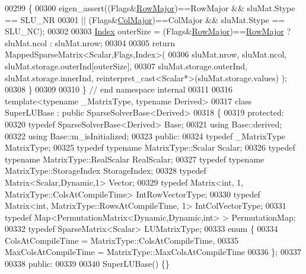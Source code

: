 \begin{DoxyCode}
00299 \{
00300   eigen\_assert((Flags&\hyperlink{group__enums_ggaacded1a18ae58b0f554751f6cdf9eb13acfcde9cd8677c5f7caf6bd603666aae3}{RowMajor})==RowMajor && sluMat.Stype == SLU\_NR
00301          || (Flags&\hyperlink{group__enums_ggaacded1a18ae58b0f554751f6cdf9eb13a0cbd4bdd0abcfc0224c5fcb5e4f6669a}{ColMajor})==ColMajor && sluMat.Stype == SLU\_NC);
00302 
00303   \hyperlink{namespace_eigen_a62e77e0933482dafde8fe197d9a2cfde}{Index} outerSize = (Flags&\hyperlink{group__enums_ggaacded1a18ae58b0f554751f6cdf9eb13acfcde9cd8677c5f7caf6bd603666aae3}{RowMajor})==\hyperlink{group__enums_ggaacded1a18ae58b0f554751f6cdf9eb13acfcde9cd8677c5f7caf6bd603666aae3}{RowMajor} ? sluMat.ncol : sluMat.nrow;
00304 
00305   \textcolor{keywordflow}{return} MappedSparseMatrix<Scalar,Flags,Index>(
00306     sluMat.nrow, sluMat.ncol, sluMat.storage.outerInd[outerSize],
00307     sluMat.storage.outerInd, sluMat.storage.innerInd, reinterpret\_cast<Scalar*>(sluMat.storage.values) );
00308 \}
00309 
00310 \} \textcolor{comment}{// end namespace internal}
00311 
00316 \textcolor{keyword}{template}<\textcolor{keyword}{typename} \_MatrixType, \textcolor{keyword}{typename} Derived>
00317 \textcolor{keyword}{class }SuperLUBase : \textcolor{keyword}{public} SparseSolverBase<Derived>
00318 \{
00319   \textcolor{keyword}{protected}:
00320     \textcolor{keyword}{typedef} SparseSolverBase<Derived> Base;
00321     \textcolor{keyword}{using} Base::derived;
00322     \textcolor{keyword}{using} Base::m\_isInitialized;
00323   \textcolor{keyword}{public}:
00324     \textcolor{keyword}{typedef} \_MatrixType MatrixType;
00325     \textcolor{keyword}{typedef} \textcolor{keyword}{typename} MatrixType::Scalar Scalar;
00326     \textcolor{keyword}{typedef} \textcolor{keyword}{typename} MatrixType::RealScalar RealScalar;
00327     \textcolor{keyword}{typedef} \textcolor{keyword}{typename} MatrixType::StorageIndex StorageIndex;
00328     \textcolor{keyword}{typedef} Matrix<Scalar,Dynamic,1> Vector;
00329     \textcolor{keyword}{typedef} Matrix<int, 1, MatrixType::ColsAtCompileTime> IntRowVectorType;
00330     \textcolor{keyword}{typedef} Matrix<int, MatrixType::RowsAtCompileTime, 1> IntColVectorType;    
00331     \textcolor{keyword}{typedef} Map<PermutationMatrix<Dynamic,Dynamic,int> > PermutationMap;
00332     \textcolor{keyword}{typedef} SparseMatrix<Scalar> LUMatrixType;
00333     \textcolor{keyword}{enum} \{
00334       ColsAtCompileTime = MatrixType::ColsAtCompileTime,
00335       MaxColsAtCompileTime = MatrixType::MaxColsAtCompileTime
00336     \};
00337 
00338   \textcolor{keyword}{public}:
00339 
00340     SuperLUBase() \{\}

\end{DoxyCode}
